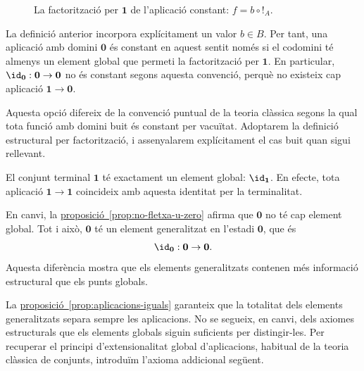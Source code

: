 \begin{figure}[H]
  \centering
{}
\caption{La factorització per \(\mathbf1\) de l'aplicació constant: \(f=b\circ {!}_A\).}
  \label{fig:aplicacio-constant}
\end{figure}

\begin{observacio}\label{obs:constants-domini-buit}
La definició anterior incorpora explícitament un valor \(b\in B\). Per tant, una aplicació amb domini \(\mathbf0\) és constant en aquest sentit només si el codomini té almenys un element global que permeti la factorització per \(\mathbf1\). En particular, \(\id_{\mathbf0}:\mathbf0\to\mathbf0\) no és constant segons aquesta convenció, perquè no existeix cap aplicació \(\mathbf1\to\mathbf0\).

Aquesta opció difereix de la convenció puntual de la teoria clàssica segons la qual tota funció amb domini buit és constant per vacuïtat. Adoptarem la definició estructural per factorització, i assenyalarem explícitament el cas buit quan sigui rellevant.
\end{observacio}

\begin{observacio}\label{obs:punts-zero-u}
El conjunt terminal \(\mathbf1\) té exactament un element global: \(\id_{\mathbf1}\). En efecte, tota aplicació \(\mathbf1\to\mathbf1\) coincideix amb aquesta identitat per la terminalitat.

En canvi, la \hyperref[prop:no-fletxa-u-zero]{proposició~\ref*{prop:no-fletxa-u-zero}} afirma que \(\mathbf0\) no té cap element global. Tot i això, \(\mathbf0\) té un element generalitzat en l'estadi \(\mathbf0\), que és
\[
\id_{\mathbf0}:\mathbf0\to\mathbf0.
\]
Aquesta diferència mostra que els elements generalitzats contenen més informació estructural que els punts globals.
\end{observacio}

La \hyperref[prop:aplicacions-iguals]{proposició~\ref*{prop:aplicacions-iguals}} garanteix que la totalitat dels elements generalitzats separa sempre les aplicacions. No se segueix, en canvi, dels axiomes estructurals que els elements globals siguin suficients per distingir-les. Per recuperar el principi d'extensionalitat global d'aplicacions, habitual de la teoria clàssica de conjunts, introduïm l'axioma addicional següent.

